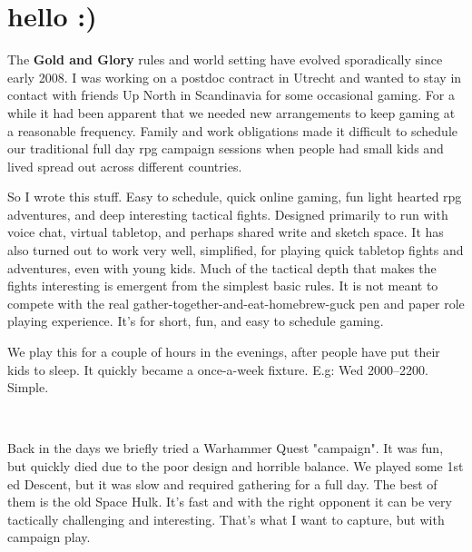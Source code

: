 \documentclass[11pt, twoside, titlepage, a4paper]{report}
\renewcommand{\chaptermark}[1]{\markboth{#1}{}}
\begin{document}
\normalsize





\cleardoublepage                   %
\thispagestyle{empty}
\raggedbottom

\chaptermark{hello}
\chapter*{hello :)}

The \textbf{Gold and Glory} rules and world setting have evolved sporadically since early 2008. I was working on a postdoc contract in Utrecht and wanted to stay in contact with friends Up North in Scandinavia for some occasional gaming.
For a while it had been apparent that we needed new arrangements to keep gaming at a reasonable frequency. Family and work obligations made it difficult to schedule our traditional full day rpg campaign sessions when people had small kids and lived spread out across different countries.

So I wrote this stuff. Easy to schedule, quick online gaming, fun light hearted rpg adventures, and deep interesting tactical fights. Designed primarily to run with voice chat, virtual tabletop, and perhaps shared write and sketch space. It has also turned out to work very well, simplified, for playing quick tabletop fights and adventures, even with young kids. Much of the tactical depth that makes the fights interesting is emergent from the simplest basic rules.
It is not meant to compete with the real gather-together-and-eat-homebrew-guck pen and paper role playing experience. It's for short, fun, and easy to schedule gaming.

We play this for a couple of hours in the evenings, after people have put their kids to sleep. It quickly became a once-a-week fixture. E.g: Wed 2000--2200. Simple.

\

Back in the days we briefly tried a Warhammer Quest "campaign". It was fun, but quickly died due to the poor design and horrible balance. We played some 1st ed Descent, but it was slow and required gathering for a full day. The best of them is the old Space Hulk. It's fast and with the right opponent it can be very tactically challenging and interesting. That's what I want to capture, but with campaign play.
\end{document}
